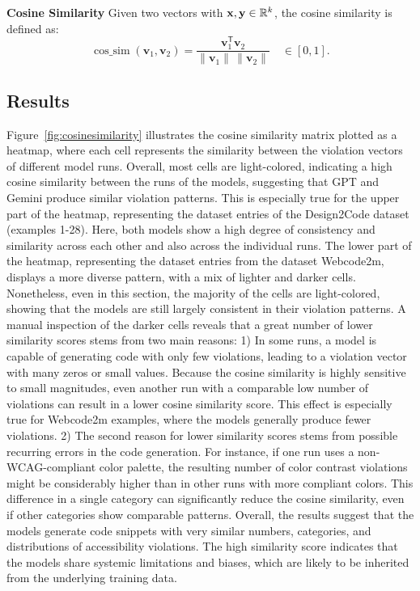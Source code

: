 \textbf{Cosine Similarity}  
  Given two vectors with $\mathbf x,\mathbf y\in\mathbb R^{k}$, the cosine similarity is defined as:
  \[
  \operatorname{cos\_sim}(\mathbf v_1,\mathbf v_2)=
  \frac{\mathbf v_1^{\mathsf T}\mathbf v_2}{\lVert \mathbf v_1\rVert\,\lVert \mathbf v_2\rVert}
  \quad\in[0,1].
\]


\subsection{Results}
Figure~\ref{fig:cosinesimilarity} illustrates the cosine similarity matrix 
plotted as a heatmap, where each cell represents the similarity between 
the violation vectors of different model runs. 
Overall, most cells 
are light-colored, indicating a high cosine similarity 
between the runs of the models, suggesting that GPT and Gemini
produce similar violation patterns.\newline
This is especially true 
for the upper part of the heatmap, representing the 
dataset entries of the Design2Code dataset (examples 1-28). 
Here, both models 
show a high degree of consistency and similarity across 
each other and also across the individual runs.
The lower part of the heatmap, representing the
dataset entries from the dataset Webcode2m, displays 
a more diverse pattern, with a mix of lighter and 
darker cells. Nonetheless, even in this section, 
the majority of the cells are light-colored, showing
that the models are still largely consistent in their violation 
patterns.\newline
A manual inspection of the darker cells reveals 
that a great number of lower similarity scores stems from 
two main reasons: 1) In some runs, a model is capable 
of generating code with only few violations, leading to 
a violation vector with many zeros or small values.
Because the cosine similarity is highly sensitive to 
small magnitudes, even another run with a comparable low
number of violations can result in a lower cosine similarity score. 
This effect is especially true for Webcode2m examples, where the models generally 
produce fewer violations. 
2) The second reason for lower similarity scores stems 
from possible recurring errors in the code generation. 
For instance, if one run uses a non-WCAG-compliant color 
palette, the resulting number of color contrast violations 
might be considerably higher than in other runs with 
more compliant colors.
This difference in a single category can significantly 
reduce the cosine similarity, even if other categories
show comparable patterns.\newline 
Overall, the results suggest that the models generate 
code snippets with very similar numbers, 
categories, and distributions of accessibility violations. 
The high similarity score indicates that the models share systemic
limitations and biases, which are likely to be inherited 
from the underlying training data.

